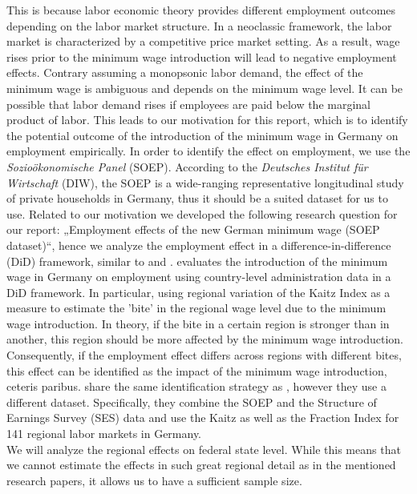 \documentclass[a4paper]{article}
\begin{document}
This is because labor economic theory provides different employment outcomes depending on the labor market structure. In a neoclassic framework, the labor market is characterized by a competitive price market setting.  As a result, wage rises prior to the minimum wage introduction will lead to negative employment effects. Contrary assuming a monopsonic labor demand, the effect of the minimum wage is ambiguous and depends on the minimum wage level. It can be possible that labor demand rises if employees are paid below the marginal product of labor.
This leads to our motivation for this report, which is to identify the potential outcome of the introduction of the minimum wage in Germany on employment empirically. In order to identify the effect on employment, we use the \textit{Sozioökonomische Panel} (SOEP). According to the \textit{Deutsches Institut für Wirtschaft} (DIW), the SOEP is a wide-ranging representative longitudinal study of private households in Germany, thus it should be a suited dataset for us to use. 
Related to our motivation we developed the following research question for our report: „Employment effects of the new German minimum wage (SOEP dataset)“, hence we analyze the employment effect in a difference-in-difference (DiD) framework, similar to \cite{schmitz2017effects} and \cite{caliendo2017short}. 
\cite{schmitz2017effects} evaluates the introduction of the minimum wage in Germany on employment using country-level administration data in a DiD framework. In particular, using regional variation of the Kaitz Index as a measure to estimate the 'bite' in  the regional wage level due to the minimum wage introduction. In theory, if the bite in a certain region is stronger than in another, this region should be more affected by the minimum wage introduction. Consequently, if the employment effect differs across regions with different bites, this effect can be identified as the impact of the minimum wage introduction, ceteris paribus.
\cite{caliendo2017short} share the same identification strategy as \cite{schmitz2017effects}, however they use a different dataset. Specifically, they combine the SOEP and the Structure of Earnings Survey (SES) data and use the Kaitz as well as the Fraction Index for 141 regional labor markets in Germany. \\
We will analyze the regional effects on federal state level. While this means that we cannot estimate the effects in such great regional detail as in the mentioned research papers, it allows us to have a sufficient sample size. \\
\end{document}
